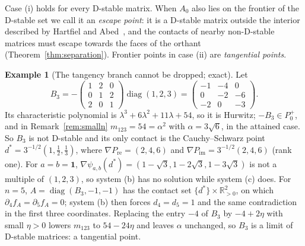 \documentclass[11pt,a4paper]{article}
\theoremstyle{plain}
\theoremstyle{definition}
\newtheorem{example}[theorem]{Example}
\newcommand{\R}{\mathbb{R}}
\newcommand{\diag}{\operatorname{diag}}
\newcommand{\Pre}{P_{\mathrm{re}}}
\newcommand{\Pim}{P_{\mathrm{im}}}
\begin{document}
Case (i) holds for every D-stable matrix. When $A_0$ also lies on the frontier of the D-stable set we call it an
\emph{escape point}: it is a D-stable matrix outside the interior described by Hartfiel and
Abed~\cite{Hartfiel1980,Abed1986}, and the contacts of nearby non-D-stable matrices must escape towards the faces
of the orthant (Theorem~\ref{thm:separation}). Frontier points in case (ii) are \emph{tangential points}.

\begin{example}[The tangency branch cannot be dropped; exact]\label{ex:b3}
Let
\[B_3=-\begin{pmatrix}1&2&0\\0&1&2\\2&0&1\end{pmatrix}\diag(1,2,3)
=\begin{pmatrix}-1&-4&0\\0&-2&-6\\-2&0&-3\end{pmatrix}.\]
Its characteristic polynomial is $\lambda^3+6\lambda^2+11\lambda+54$, so it is Hurwitz;
$-B_3\in P_0^+$, and in Remark~\ref{rem:smalln} $m_{123}=54=\alpha^2$ with $\alpha=3\sqrt6$, in the attained case. So
$B_3$ is not D-stable and its only contact is the Cauchy--Schwarz point $d^{*}=3^{-1/2}(1,\tfrac12,\tfrac13)$, where $\nabla\Pre=(2,4,6)$ and $\nabla\Pim=3^{-1/2}(2,4,6)$ (rank one). For
$a=b=\mathbf 1$, $\nabla\psi_{a,b}(d^{*})=(1-\sqrt3,1-2\sqrt3,1-3\sqrt3)$ is not a multiple of $(1,2,3)$, so system
(b) has no solution while system (c) does. For $n=5$, $A=\diag(B_3,-1,-1)$ has the contact set
$\{d^{*}\}\times\R^2_{>0}$, on which $\partial_4f_A=\partial_5f_A=0$; system (b) then forces $d_4=d_5=1$ and the
same contradiction in the first three coordinates. Replacing the entry $-4$ of $B_3$ by $-4+2\eta$ with small
$\eta>0$ lowers $m_{123}$ to $54-24\eta$ and leaves $\alpha$ unchanged, so $B_3$ is a limit of D-stable matrices: a
tangential point.
\end{example}
\end{document}
